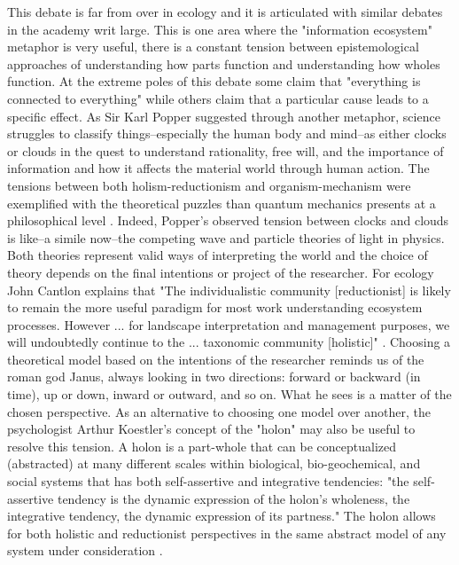 This debate is far from over in ecology and it is articulated with similar debates in the academy writ large. This is one area where the "information ecosystem" metaphor is very useful, there is a constant tension between epistemological approaches of understanding how  parts function and understanding how wholes function. At the extreme poles of this debate some claim that "everything is connected to everything" while others claim that a particular cause leads to a specific effect. As Sir Karl Popper suggested through another metaphor, science struggles to classify things--especially the human body and mind--as either clocks or clouds in the quest to understand rationality, free will, and the importance of information and how it affects the material world through human action. The tensions between both holism-reductionism and organism-mechanism were exemplified with the theoretical puzzles than quantum mechanics presents at a philosophical level \citep{popper_1966}. Indeed, Popper's observed tension between clocks and clouds is like--a simile now--the competing wave and particle theories of light in physics. Both theories represent valid ways of interpreting the world and the choice of theory depends on the final intentions or project of the researcher. For ecology John Cantlon explains that "The individualistic community [reductionist] is likely to remain the more useful paradigm for most work understanding ecosystem processes. However ... for landscape interpretation and management purposes, we will undoubtedly continue to the ... taxonomic community [holistic]" \citep[Cantlon 1996, cited in ][p. 241]{barbour_1996}. Choosing a theoretical model based on the intentions of the researcher reminds us of the roman god Janus, always looking in two directions: forward or backward (in time), up or down, inward or outward, and so on. What he sees is a matter of the chosen perspective. As an alternative to choosing one model over another, the psychologist Arthur Koestler's concept of the "holon" may also be useful to resolve this tension. A holon is a part-whole that can be conceptualized (abstracted) at many different scales within biological, bio-geochemical, and social systems that has both self-assertive and integrative tendencies: "the self-assertive tendency is the dynamic expression of the holon's wholeness, the integrative tendency, the dynamic expression of its partness." The holon allows for both holistic and reductionist perspectives in the same abstract model of any system under consideration \citep[][p. 56] {koestler_1967}.


